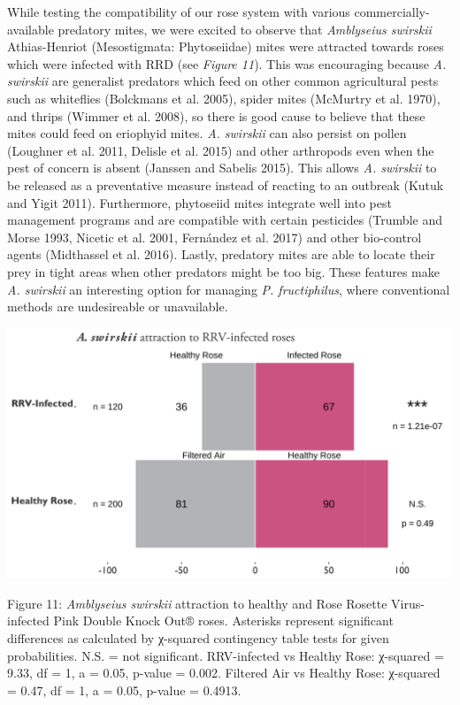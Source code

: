 \documentclass[12pt,final,CPage]{ufthesis}
\begin{document}
{  While testing the compatibility of our rose system with various commercially-available predatory mites, we were excited to observe that \emph{Amblyseius swirskii} Athias-Henriot (Mesostigmata: Phytoseiidae) mites were attracted towards roses which were infected with RRD (see \emph{Figure 11}). This was encouraging because \emph{A. swirskii} are generalist predators which feed on other common agricultural pests such as whiteflies (Bolckmans et al. 2005), spider mites (McMurtry et al. 1970), and thrips (Wimmer et al. 2008), so there is good cause to believe that these mites could feed on eriophyid mites. \emph{A. swirskii} can also persist on pollen (Loughner et al. 2011, Delisle et al. 2015) and other arthropods even when the pest of concern is absent (Janssen and Sabelis 2015). This allows \emph{A. swirskii} to be released as a preventative measure instead of reacting to an outbreak (Kutuk and Yigit 2011). Furthermore, phytoseiid mites integrate well into pest management programs and are compatible with certain pesticides (Trumble and Morse 1993, Nicetic et al. 2001, Fernández et al. 2017) and other bio-control agents (Midthassel et al. 2016). Lastly, predatory mites are able to locate their prey in tight areas when other predators might be too big. These features make \emph{A. swirskii} an interesting option for managing \emph{P. fructiphilus}, where conventional methods are undesireable or unavailable.
  \begin{center}\includegraphics[width=0.8\linewidth]{figure/rose_graph} \end{center}

  Figure 11: \emph{Amblyseius swirskii} attraction to healthy and Rose Rosette Virus-infected Pink Double Knock Out® roses. Asterisks represent significant differences as calculated by χ-squared contingency table tests for given probabilities. N.S. = not significant. RRV-infected vs Healthy Rose: χ-squared = 9.33, df = 1, a = 0.05, p-value = 0.002. Filtered Air vs Healthy Rose: χ-squared = 0.47, df = 1, a = 0.05, p-value = 0.4913.

}
\end{document}
